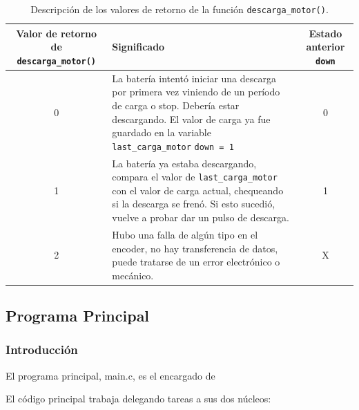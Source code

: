 \begin{itemize} [label = ·]
                        \begin{table}[h!]
                            \centering
                            \renewcommand{\arraystretch}{1.5} %
                            \setlength{\arrayrulewidth}{0.3mm} %
                            \setlength{\tabcolsep}{5pt} %
                            
                            \begin{tabular}{|c|m{8cm}|c|}
                            \hline
                            \textbf{Valor de retorno de \texttt{descarga\_motor()}} & \textbf{Significado} & \textbf{Estado anterior \texttt{down}} \\ \hline
                            0 & La batería intentó iniciar una descarga por primera vez viniendo de un período de carga o stop. Debería estar descargando. \newline El valor de carga ya fue guardado en la variable \texttt{last\_carga\_motor} \newline \texttt{down = 1} & 0 \\ \hline
                            1 & La batería ya estaba descargando, compara el valor de \texttt{last\_carga\_motor} con el valor de carga actual, chequeando si la descarga se frenó. \newline Si esto sucedió, vuelve a probar dar un pulso de descarga. & 1 \\ \hline
                            2 & Hubo una falla de algún tipo en el encoder, no hay transferencia de datos, puede tratarse de un error electrónico o mecánico. & X \\ \hline
                        \end{tabular}
                        
                        \caption{Descripción de los valores de retorno de la función \texttt{descarga\_motor()}.}
                        \label{tabla_descarga_motor}
                        \end{table}
                        
                 \end{itemize}
 
                
            \subsection{Programa Principal}
                \subsubsection{Introducción}
                    El programa principal, main.c, es el encargado de\par
                    El código principal trabaja delegando tareas a sus dos núcleos:\par
                    
